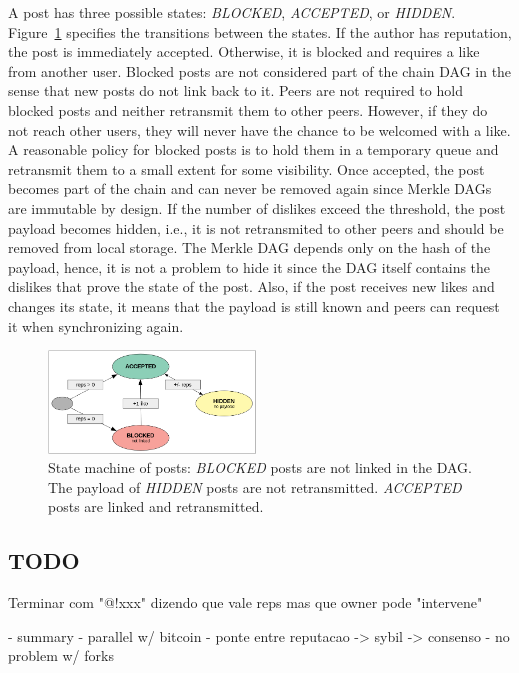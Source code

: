 \documentclass[10pt,journal,compsoc]{IEEEtran}
\begin{document}
A post has three possible states: \emph{BLOCKED}, \emph{ACCEPTED}, or
\emph{HIDDEN}.
Figure~\ref{fig.state} specifies the transitions between the states.
%
If the author has reputation, the post is immediately accepted.
Otherwise, it is blocked and requires a like from another user.
%
Blocked posts are not considered part of the chain DAG in the sense that new
posts do not link back to it.
Peers are not required to hold blocked posts and neither retransmit them to
other peers.
However, if they do not reach other users, they will never have the chance to
be welcomed with a like.
A reasonable policy for blocked posts is to hold them in a temporary queue and
retransmit them to a small extent for some visibility.
%
Once accepted, the post becomes part of the chain and can never be removed
again since Merkle DAGs are immutable by design.
%
If the number of dislikes exceed the threshold, the post payload becomes
hidden, i.e., it is not retransmited to other peers and should be removed from
local storage.
The Merkle DAG depends only on the hash of the payload, hence, it is not a
problem to hide it since the DAG itself contains the dislikes that prove the
state of the post.
Also, if the post receives new likes and changes its state, it means that the
payload is still known and peers can request it when synchronizing again.

\begin{figure}[ht]
\centering
\includegraphics[width=0.49\textwidth]{state.png}
\caption{
    State machine of posts:
    \emph{BLOCKED} posts are not linked in the DAG.
    The payload of \emph{HIDDEN} posts are not retransmitted.
    \emph{ACCEPTED} posts are linked and retransmitted.
}
\label{fig.state}
\end{figure}

\subsection{TODO}

Terminar com "@!xxx" dizendo que vale reps mas que owner pode "intervene"

- summary
    - parallel w/ bitcoin
        - ponte entre reputacao -> sybil -> consenso
    - no problem w/ forks
\end{document}
